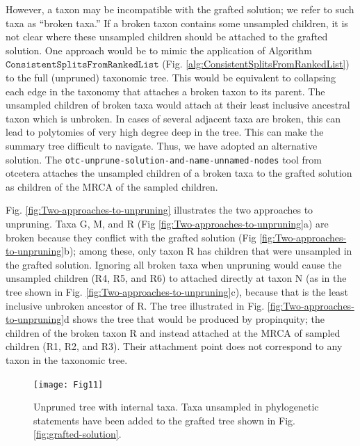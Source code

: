 \documentclass[fleqn,12pt,lineno,english]{wlpeerj}
\begin{document}
However, a taxon may be incompatible with the grafted solution; we
refer to such taxa as ``broken taxa.'' If a broken taxon contains
some unsampled children, it is not clear where these unsampled children
should be attached to the grafted solution. One approach would be
to mimic the application of Algorithm $\texttt{ConsistentSplitsFromRankedList}$ (Fig. \ref{alg:ConsistentSplitsFromRankedList})
to the full (unpruned) taxonomic tree. This would be equivalent to
collapsing each edge in the taxonomy that attaches a broken taxon
to its parent. The unsampled children of broken taxa would attach
at their least inclusive ancestral taxon which is unbroken. In cases
of several adjacent taxa are broken, this can lead to polytomies of
very high degree deep in the tree. This can make the summary tree
difficult to navigate. Thus, we have adopted an alternative solution.
The \texttt{otc-unprune-solution-and-name-unnamed-nodes} tool from
otcetera attaches the unsampled children of a broken taxa to the grafted
solution as children of the MRCA of the sampled children.

Fig. \ref{fig:Two-approaches-to-unpruning} illustrates the two
approaches to unpruning. Taxa G, M, and R (Fig \ref{fig:Two-approaches-to-unpruning}a)
are broken because they conflict with the grafted solution (Fig \ref{fig:Two-approaches-to-unpruning}b);
among these, only taxon R has children that were unsampled in the
grafted solution. Ignoring all broken taxa when unpruning would cause
the unsampled children (R4, R5, and R6) to attached directly at taxon
N (as in the tree shown in Fig. \ref{fig:Two-approaches-to-unpruning}c),
because that is the least inclusive unbroken ancestor of R. The tree
illustrated in Fig. \ref{fig:Two-approaches-to-unpruning}d shows the
tree that would be produced by propinquity; the children of the broken
taxon R and instead attached at the MRCA of sampled children (R1,
R2, and R3). Their attachment point does not correspond to any taxon
in the taxonomic tree.


\begin{figure}
  
\begin{centering}
\texttt{[image: Fig11]}
\par\end{centering}
\caption{\label{fig:unprune}Unpruned tree with internal taxa. Taxa unsampled in phylogenetic
statements have been added to the grafted tree shown
in Fig. \ref{fig:grafted-solution}.}
\end{figure}
\end{document}
